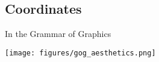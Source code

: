 \vspace{-2mm}

\subsection*{Coordinates}
\vspace{-2mm}
\begin{minipage}[t]{0.6\textwidth}
    In the Grammar of Graphics
    \hspace{1cm}
\end{minipage}%
\begin{minipage}[t]{0.4\textwidth}
    \vspace{-20pt}
    \texttt{[image: figures/gog\_aesthetics.png]}
\end{minipage}